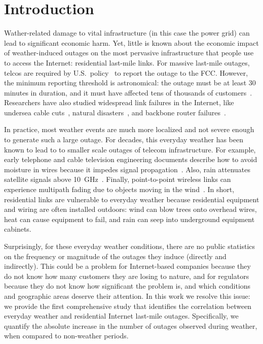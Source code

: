 \section{Introduction}

Wather-related damage to vital infrastructure
(in this case the power grid) can lead to significant economic harm.
%
Yet, %
little is known about the economic impact of
weather-induced outages on the most pervasive infrastructure that people use to
access the Internet: residential last-mile links.
%
For massive last-mile outages, telcos are required by U.S.~policy~\cite{cfr49}
to report the outage to the FCC.
%
However, the minimum reporting threshold is astronomical: the outage must be at
least 30 minutes in duration, and it must have affected tens of thousands of
customers~\cite{cfr49}.
%
Researchers have also studied widespread link failures in the Internet,
like undersea cable cuts~\cite{chan-pam11, bilski-ccis09}, natural
disasters~\cite{heidemann-sandy}, and backbone router
failures~\cite{iannaccone-imw02}. 

In practice, most weather events are much more localized and not severe enough
to generate such a large outage.
%
For decades, this everyday weather has been known to lead to to smaller scale
outages of telecom infrastructure.
%
For example, early telephone and cable television engineering documents
describe how to avoid moisture in wires because it impedes signal
propagation~\cite{aiee09-jewett, toct66-smith}.  Also, rain attenuates
satellite signals above 10~GHz~\cite{ieee75-hogg}.  Finally, point-to-point
wireless links can experience multipath fading due to objects moving in the
wind~\cite{ieeecm01-bolcskei}. In short, residential links are vulnerable to
everyday weather because residential equipment and wiring are often installed
outdoors: wind can blow trees onto overhead wires, heat can cause equipment to
fail, and rain can seep into underground equipment cabinets.
 
Surprisingly, for these everyday weather conditions, there are no public
statistics on the frequency or magnitude of the outages they induce (directly
and indirectly).
%
This could be a problem for Internet-based companies because they do not know
how many customers they are losing to nature, and for regulators because they
do not know how significant the problem is, and which conditions and geographic
areas deserve their attention.
%
In this work we resolve this issue: we provide the first comprehensive study
that identifies the correlation between everyday weather and residential
Internet last-mile outages.
%
Specifically, we quantify the absolute increase in the number of outages
observed during weather, when compared to non-weather periods.

